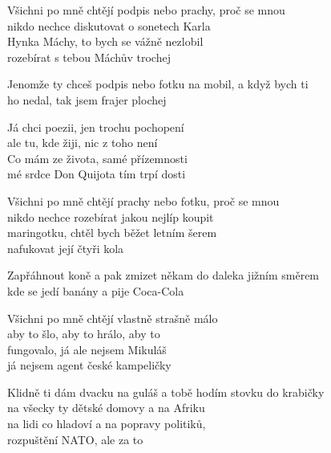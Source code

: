 
\ve{}
Všichni po mně chtějí podpis nebo prachy, proč se mnou\\
nikdo nechce diskutovat o sonetech Karla\\
Hynka Máchy, to bych se vážně nezlobil\\
rozebírat s tebou Máchův trochej

Jenomže ty chceš podpis nebo fotku na mobil, a když bych ti\\
ho nedal, tak jsem frajer plochej 

\cho{}	
Já chci poezii, jen trochu pochopení \\
ale tu, kde žiji, nic z toho není\\
Co mám ze života, samé přízemnosti\\
mé srdce Don Quijota tím trpí dosti

\ve{}
Všichni po mně chtějí prachy nebo fotku, proč se mnou\\
nikdo nechce rozebírat jakou nejlíp koupit\\
maringotku, chtěl bych běžet letním šerem\\
nafukovat její čtyři kola

Zapřáhnout koně a pak zmizet někam do daleka jižním směrem\\
kde se jedí banány a pije Coca-Cola

\cho{}

\ve{}
Všichni po mně chtějí vlastně strašně málo\\
aby to šlo, aby to hrálo, aby to \\
fungovalo, já ale nejsem Mikuláš\\
já nejsem agent české kampeličky

Klidně ti dám dvacku na guláš a tobě hodím stovku do krabičky\\
na všecky ty dětské domovy a na Afriku\\
na lidi co hladoví a na popravy politiků,\\
rozpuštění NATO, ale za to

\cho{}

\esong